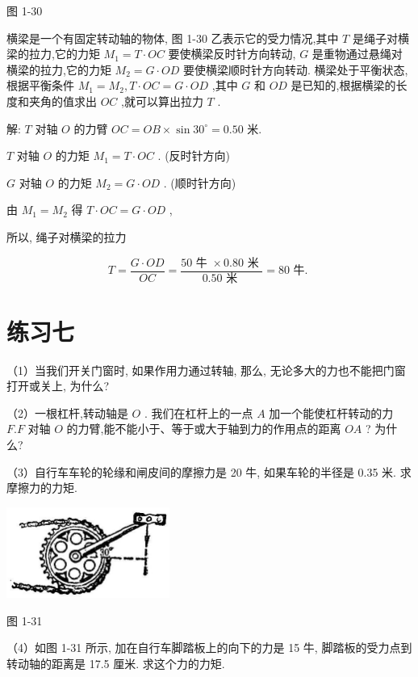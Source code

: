 \documentclass[10pt]{article}
\begin{document}
图 1-30

横梁是一个有固定转动轴的物体, 图 1-30 乙表示它的受力情况,其中 \(T\) 是绳子对横梁的拉力,它的力矩 \({M}_{1} = T \cdot {OC}\) 要使横梁反时针方向转动, \(G\) 是重物通过悬绳对横梁的拉力,它的力矩 \({M}_{2} = G \cdot {OD}\) 要使横梁顺时针方向转动. 横梁处于平衡状态,根据平衡条件 \({M}_{1} = {M}_{2},T \cdot {OC} = G \cdot {OD}\) ,其中 \(G\) 和 \({OD}\) 是已知的,根据横梁的长度和夹角的值求出 \({OC}\) ,就可以算出拉力 \(T\) .

解: \(T\) 对轴 \(O\) 的力臂 \({OC} = {OB} \times \sin {30}^{ \circ } = {0.50}\) 米.

\(T\) 对轴 \(O\) 的力矩 \({M}_{1} = T \cdot {OC}\) . (反时针方向)

\(G\) 对轴 \(O\) 的力矩 \({M}_{2} = G \cdot {OD}\) . (顺时针方向)

由 \({M}_{1} = {M}_{2}\) 得 \(T \cdot {OC} = G \cdot {OD}\) ,

所以, 绳子对横梁的拉力

\[
T = \frac{G \cdot {OD}}{OC} = \frac{{50}\text{ 牛 } \times {0.80}\text{ 米 }}{{0.50}\text{ 米 }} = {80}\text{ 牛. }
\]

\section*{练习七}

（1）当我们开关门窗时, 如果作用力通过转轴, 那么, 无论多大的力也不能把门窗打开或关上, 为什么?

（2）一根杠杆,转动轴是 \(O\) . 我们在杠杆上的一点 \(A\) 加一个能使杠杆转动的力 \(F.F\) 对轴 \(O\) 的力臂,能不能小于、等于或大于轴到力的作用点的距离 \({OA}\) ? 为什么?

（3）自行车车轮的轮缘和闸皮间的摩擦力是 20 牛, 如果车轮的半径是 0.35 米. 求摩擦力的力矩.

\begin{center}
\includegraphics[max width=0.4\textwidth]{images/01912d55-147c-70aa-b0e0-1782a122f948_44_653949.jpg}
\end{center}

图 1-31

（4）如图 1-31 所示, 加在自行车脚踏板上的向下的力是 15 牛, 脚踏板的受力点到转动轴的距离是 17.5 厘米. 求这个力的力矩.
\end{document}
